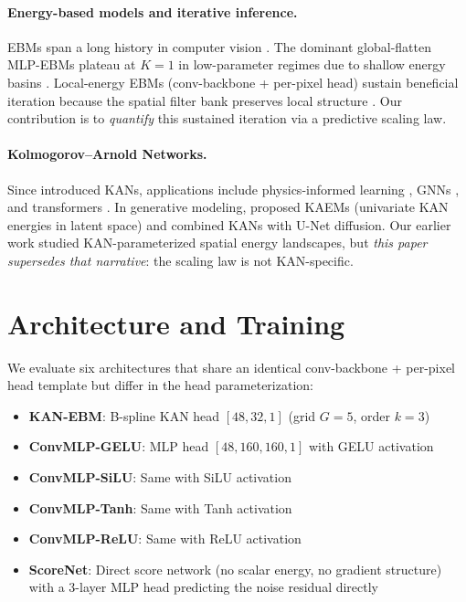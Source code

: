 \documentclass[letterpaper]{article}
\begin{document}
\paragraph{Energy-based models and iterative inference.} EBMs span a long history in computer vision \citep{lecun2006ebm, du2019implicit, nijkamp2019anatomy, xie2016theory}. The dominant global-flatten MLP-EBMs plateau at $K{=}1$ in low-parameter regimes due to shallow energy basins \citep{gao2020learning}. Local-energy EBMs (conv-backbone + per-pixel head) sustain beneficial iteration because the spatial filter bank preserves local structure \citep{du2021conjunction}. Our contribution is to \emph{quantify} this sustained iteration via a predictive scaling law.

\paragraph{Kolmogorov--Arnold Networks.} Since \citet{liu2024kan} introduced KANs, applications include physics-informed learning \citep{shukla2024physicsinformed}, GNNs \citep{kiamari2024gkan}, and transformers \citep{kat2024}. In generative modeling, \citet{raj2025kaem} proposed KAEMs (univariate KAN energies in latent space) and \citet{li2024ukan} combined KANs with U-Net diffusion. Our earlier work \citep{khatib2026kan} studied KAN-parameterized spatial energy landscapes, but \emph{this paper supersedes that narrative}: the scaling law is not KAN-specific.

\section{Architecture and Training}
\label{sec:architecture}

We evaluate six architectures that share an identical conv-backbone + per-pixel head template but differ in the head parameterization:

\begin{itemize}[leftmargin=*,topsep=2pt,itemsep=1pt]
\item \textbf{KAN-EBM}: B-spline KAN head $[48, 32, 1]$ (grid $G{=}5$, order $k{=}3$) \citep{liu2024kan}
\item \textbf{ConvMLP-GELU}: MLP head $[48, 160, 160, 1]$ with GELU activation
\item \textbf{ConvMLP-SiLU}: Same with SiLU activation
\item \textbf{ConvMLP-Tanh}: Same with Tanh activation
\item \textbf{ConvMLP-ReLU}: Same with ReLU activation
\item \textbf{ScoreNet}: Direct score network (no scalar energy, no gradient structure) with a 3-layer MLP head predicting the noise residual directly
\end{itemize}
\end{document}
